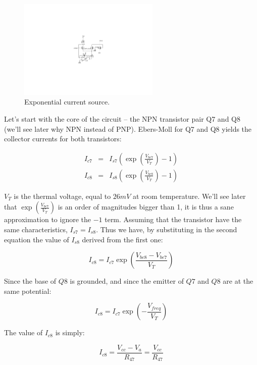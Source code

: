 \documentclass[a4paper,11pt]{article}
\begin{document}
\begin{figure}
\centering
\includegraphics[width=0.6\textwidth]{smr4_expo_current_source.pdf}
\caption{Exponential current source.}
\label{fig:expo}
\end{figure}

Let's start with the core of the circuit -- the NPN transistor pair Q7 and Q8 (we'll see later why NPN instead of PNP). Ebers-Moll for Q7 and Q8 yields the collector currents for both transistors:

\begin{eqnarray}
I_{c7} &=& I_{s7} \left(\exp \left( \frac{V_{be7}}{V_T} \right) - 1 \right) \\
I_{c8} &=& I_{s8} \left(\exp \left( \frac{V_{be8}}{V_T} \right) - 1 \right)
\end{eqnarray}

$V_T$ is the thermal voltage, equal to $26 mV$ at room temperature. We'll see later that $\exp \left( \frac{V_{be7}}{V_T} \right)$ is an order of magnitudes bigger than 1, it is thus a sane approximation to ignore the $- 1$ term. Assuming that the transistor have the same characteristics, $I_{s7} = I_{s8}$. Thus we have, by substituting in the second equation the value of $I_{s8}$ derived from the first one:

\begin{equation}
I_{c8} = I_{c7} \exp \left( \frac{V_{be8} - V_{be7}}{V_T} \right)
\end{equation}

Since the base of $Q8$ is grounded, and since the emitter of $Q7$ and $Q8$ are at the same potential:

\begin{equation}
I_{c8} = I_{c7} \exp \left( -\frac{V_{freq}}{V_T} \right)
\end{equation}

The value of $I_{c8}$ is simply:

\begin{equation}
I_{c8} = \frac{V_{cc} - V_a}{R_{47}} = \frac{V_{cc}}{R_{47}}
\end{equation}
\end{document}
